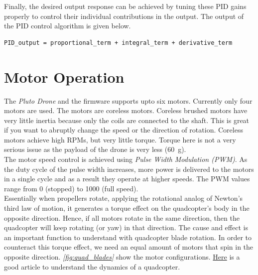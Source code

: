 \documentclass[a4paper,12pt,oneside]{book}
\begin{document}
\bigskip

Finally, the desired output response can be achieved by tuning these PID gains properly to control their individual contributions in the output. The output of the PID control algorithm is given below.

\begin{center}
\begin{BVerbatim}
PID_output = proportional_term + integral_term + derivative_term
\end{BVerbatim}
\end{center}

\bigskip

\section{Motor Operation}
The \textit{Pluto Drone} and the firmware supports upto six motors. Currently only four motors are used. The motors are coreless motors. Coreless brushed motors have very little inertia because only the coils are connected to the shaft. This is great if you want to abruptly change the speed or the direction of rotation. Coreless motors achieve high RPMs, but very little torque. Torque here is not a very serious issue as the payload of the drone is very less (\SI{60}{\gram}).\\ 

The motor speed control is achieved using \textit{Pulse Width Modulation (PWM)}. As the duty cycle of the pulse width increases, more power is delivered to the motors in a single cycle and as a result they operate at higher speeds. The PWM values range from 0 (stopped) to 1000 (full speed).\\

Essentially when propellers rotate, applying the rotational analog of Newton’s third law of motion, it generates a torque effect on the quadcopter’s body in the opposite direction. Hence, if all motors rotate in the same direction, then the quadcopter will keep rotating (or yaw) in that direction. The cause and effect is an important function to understand with quadcopter blade rotation. In order to counteract this torque effect, we need an equal amount of motors that spin in the opposite direction. \textit{\autoref{fig:quad_blades}} show the motor configurations. \href{http://www.droneybee.com/quadcopter-blade-rotation-lift/}{Here} is a good article to understand the dynamics of a quadcopter.\cite{kada}\\
\end{document}
